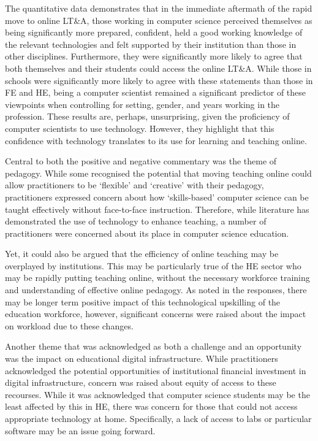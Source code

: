\documentclass[sigconf]{acmart}
\begin{document}
The quantitative data demonstrates that in the immediate aftermath of
the rapid move to online LT\&A, those working in computer science
perceived themselves as being significantly more prepared, confident,
held a good working knowledge of the relevant technologies and felt
supported by their institution than those in other
disciplines. Furthermore, they were significantly more likely to agree
that both themselves and their students could access the online
LT\&A. While those in schools were significantly more likely to agree
with these statements than those in FE and HE, being a computer
scientist remained a significant predictor of these viewpoints when
controlling for setting, gender, and years working in the profession.
These results are, perhaps, unsurprising, given the proficiency of
computer scientists to use technology. However, they highlight that
this confidence with technology translates to its use for learning and
teaching online.

Central to both the positive and negative commentary was the theme of
pedagogy. While some recognised the potential that moving teaching
online could allow practitioners to be `flexible' and `creative' with
their pedagogy, practitioners expressed concern about how
`skills-based' computer science can be taught effectively without
face-to-face instruction. Therefore, while literature has demonstrated
the use of technology to enhance teaching, a number of practitioners
were concerned about its place in computer science education.

Yet, it could also be argued that the efficiency of online teaching
may be overplayed by institutions. This may be particularly true of
the HE sector who may be rapidly putting teaching online, without the
necessary workforce training and understanding of effective online
pedagogy.  As noted in the responses, there may be longer term
positive impact of this technological upskilling of the education
workforce, however, significant concerns were raised about the impact
on workload due to these changes.

Another theme that was acknowledged as both a challenge and an
opportunity was the impact on educational digital
infrastructure. While practitioners acknowledged the potential
opportunities of institutional financial investment in digital
infrastructure, concern was raised about equity of access to these
recourses. While it was acknowledged that computer science students
may be the least affected by this in HE, there was concern for those
that could not access appropriate technology at home. Specifically, a
lack of access to labs or particular software may be an issue going
forward.
\end{document}
